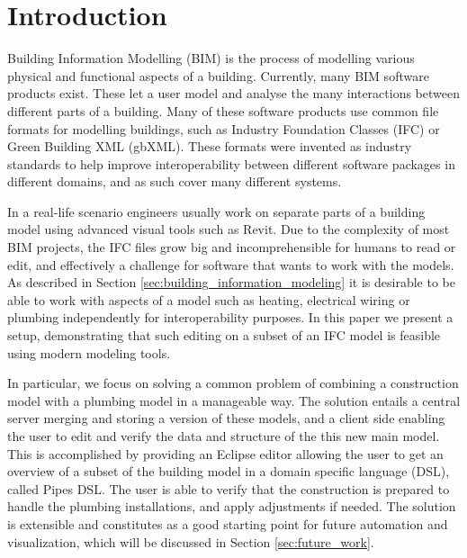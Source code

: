 


\setcounter{page}{1}
\section{Introduction}
Building Information Modelling (BIM) is the process of modelling various physical and functional aspects of a building. Currently, many BIM software products exist. These let a user model and analyse the many interactions between different parts of a building. Many of these software products use common file formats for modelling buildings, such as Industry Foundation Classes (IFC) or Green Building XML (gbXML). These formats were invented as industry standards to help improve interoperability between different software packages in different domains, and as such cover many different systems.

In a real-life scenario engineers usually work on separate parts of a building model using advanced visual tools such as Revit\cite{revit12}. Due to the complexity of most BIM projects, the IFC files grow big and incomprehensible for humans to read or edit, and effectively a challenge for software that wants to work with the models. As described in Section \ref{sec:building_information_modeling} it is desirable to be able to work with aspects of a model such as heating, electrical wiring or plumbing independently for interoperability purposes. In this paper we present a setup, demonstrating that such editing on a subset of an IFC model is feasible using modern modeling tools.

In particular, we focus on solving a common problem of combining a construction model with a plumbing model in a manageable way. The solution entails a central server merging and storing a version of these models, and a client side enabling the user to edit and verify the data and structure of the this new main model. This is accomplished by providing an Eclipse editor allowing the user to get an overview of a subset of the building model in a domain specific language (DSL), called Pipes DSL. The user is able to verify that the construction is prepared to handle the plumbing installations, and apply adjustments if needed. The solution is extensible and constitutes as a good starting point for future automation and visualization, which will be discussed in Section \ref{sec:future_work}.

